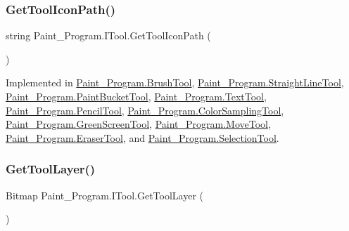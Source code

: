 \subsubsection{\texorpdfstring{Get\+Tool\+Icon\+Path()}{GetToolIconPath()}}
{\footnotesize\ttfamily string Paint\+\_\+\+Program.\+I\+Tool.\+Get\+Tool\+Icon\+Path (\begin{DoxyParamCaption}{ }\end{DoxyParamCaption})}



Implemented in \mbox{\hyperlink{class_paint___program_1_1_brush_tool_a7cc103269b01a6367edce7c994443739}{Paint\+\_\+\+Program.\+Brush\+Tool}}, \mbox{\hyperlink{class_paint___program_1_1_straight_line_tool_ae260a0f50ea86b9ae9cceb36d1093057}{Paint\+\_\+\+Program.\+Straight\+Line\+Tool}}, \mbox{\hyperlink{class_paint___program_1_1_paint_bucket_tool_aef69a21dec547869dde171a604bf1492}{Paint\+\_\+\+Program.\+Paint\+Bucket\+Tool}}, \mbox{\hyperlink{class_paint___program_1_1_text_tool_a0adfe4c942f7d97c2d9cf626fb3b78c7}{Paint\+\_\+\+Program.\+Text\+Tool}}, \mbox{\hyperlink{class_paint___program_1_1_pencil_tool_a91c7f9e9bd173b3f859cbc37f44c4f48}{Paint\+\_\+\+Program.\+Pencil\+Tool}}, \mbox{\hyperlink{class_paint___program_1_1_color_sampling_tool_a319d9e67417e473d0f76b8cafc1d7c2b}{Paint\+\_\+\+Program.\+Color\+Sampling\+Tool}}, \mbox{\hyperlink{class_paint___program_1_1_green_screen_tool_a5d25a6867cc4882d9ec31182829fb24b}{Paint\+\_\+\+Program.\+Green\+Screen\+Tool}}, \mbox{\hyperlink{class_paint___program_1_1_move_tool_a6341409c4de402ff447db2c542cc6b5b}{Paint\+\_\+\+Program.\+Move\+Tool}}, \mbox{\hyperlink{class_paint___program_1_1_eraser_tool_a5a1cb5d84a01983064c68a8dc6023ae6}{Paint\+\_\+\+Program.\+Eraser\+Tool}}, and \mbox{\hyperlink{class_paint___program_1_1_selection_tool_ac93f281cfcc677551b140c350661d9df}{Paint\+\_\+\+Program.\+Selection\+Tool}}.

\mbox{\label{interface_paint___program_1_1_i_tool_a9b057905515f42a988c166a6a40318e0}} 
\subsubsection{\texorpdfstring{Get\+Tool\+Layer()}{GetToolLayer()}}
{\footnotesize\ttfamily Bitmap Paint\+\_\+\+Program.\+I\+Tool.\+Get\+Tool\+Layer (\begin{DoxyParamCaption}{ }\end{DoxyParamCaption})}



